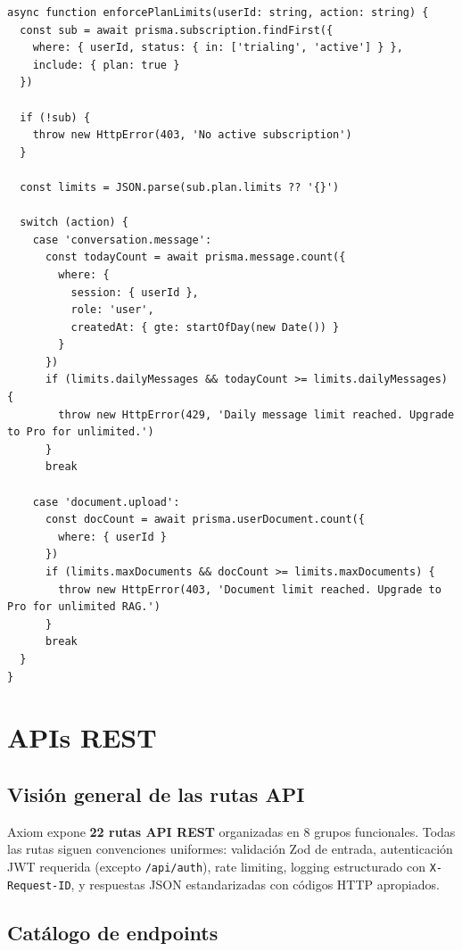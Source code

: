 \documentclass[10pt,a4paper,oneside]{report}
\begin{document}
\begin{lstlisting}[style=ts,caption={Plan-gating para módulos}]
async function enforcePlanLimits(userId: string, action: string) {
  const sub = await prisma.subscription.findFirst({
    where: { userId, status: { in: ['trialing', 'active'] } },
    include: { plan: true }
  })

  if (!sub) {
    throw new HttpError(403, 'No active subscription')
  }

  const limits = JSON.parse(sub.plan.limits ?? '{}')

  switch (action) {
    case 'conversation.message':
      const todayCount = await prisma.message.count({
        where: {
          session: { userId },
          role: 'user',
          createdAt: { gte: startOfDay(new Date()) }
        }
      })
      if (limits.dailyMessages && todayCount >= limits.dailyMessages) {
        throw new HttpError(429, 'Daily message limit reached. Upgrade to Pro for unlimited.')
      }
      break

    case 'document.upload':
      const docCount = await prisma.userDocument.count({
        where: { userId }
      })
      if (limits.maxDocuments && docCount >= limits.maxDocuments) {
        throw new HttpError(403, 'Document limit reached. Upgrade to Pro for unlimited RAG.')
      }
      break
  }
}
\end{lstlisting}

\chapter{APIs REST}

\section{Visión general de las rutas API}
Axiom expone \textbf{22 rutas API REST} organizadas en 8 grupos funcionales. Todas las rutas siguen convenciones uniformes: validación Zod de entrada, autenticación JWT requerida (excepto \texttt{/api/auth}), rate limiting, logging estructurado con \texttt{X-Request-ID}, y respuestas JSON estandarizadas con códigos HTTP apropiados.

\section{Catálogo de endpoints}
\end{document}
